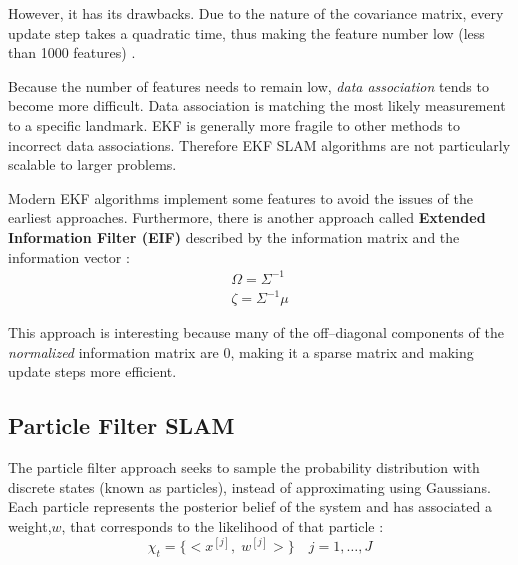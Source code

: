 However, it has its drawbacks. Due to the nature of the covariance matrix, every update step takes a quadratic time, thus making the feature number low (less than 1000 features) .

Because the number of features needs to remain low, \emph{data association} tends to become more difficult. Data association is matching the most likely measurement to a specific landmark. EKF is generally more fragile to other methods to incorrect data associations. Therefore EKF SLAM algorithms are not particularly scalable to larger problems.

Modern EKF algorithms implement some features to avoid the issues of the earliest approaches. Furthermore, there is another approach called \textbf{Extended Information Filter (EIF)} described by the information matrix and the information vector :
\begin{gather}
  \Omega = \Sigma^{-1} \\
  \zeta = \Sigma^{-1}\mu
  \label{eq:eif}
\end{gather}

This approach is interesting because many of the off--diagonal components of the \emph{normalized} information matrix are $0$, making it a sparse matrix and making update steps more efficient.

\subsection{Particle Filter SLAM} \label{sub:particle}

The particle filter approach seeks to sample the probability distribution with discrete states (known as particles), instead of approximating using Gaussians. Each particle represents the posterior belief of the system and has associated a weight,$w$, that corresponds to the likelihood of that particle :
\begin{equation}
  \chi_t = \{<x^{[j]},\;w^{[j]}>\}\quad j=1,\ldots,J
  \label{eq:pf}
\end{equation}  

